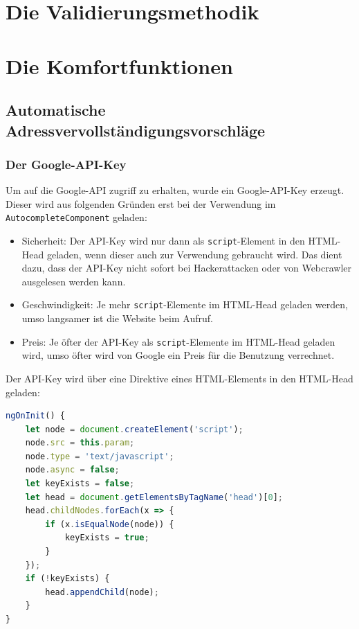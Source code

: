 \section{Die Validierungsmethodik}

\section{Die Komfortfunktionen}
\subsection{Automatische Adressvervollständigungsvorschläge}
\subsubsection{Der Google-API-Key}
Um auf die Google-API zugriff zu erhalten, wurde ein Google-API-Key erzeugt. Dieser wird aus folgenden Gründen erst bei der Verwendung im \texttt{AutocompleteComponent} geladen:

\begin{itemize}
	
	\item Sicherheit: Der API-Key wird nur dann als \texttt{script}-Element in den HTML-Head geladen, wenn dieser auch zur Verwendung gebraucht wird. Das dient dazu, dass der API-Key nicht sofort bei Hackerattacken oder von Webcrawler ausgelesen werden kann.
	
	\item Geschwindigkeit: Je mehr \texttt{script}-Elemente im HTML-Head geladen werden, umso langsamer ist die Website beim Aufruf.
	
	\item Preis: Je öfter der API-Key als \texttt{script}-Elemente im HTML-Head geladen wird, umso öfter wird von Google ein Preis für die Benutzung verrechnet.
\end{itemize}

Der API-Key wird über eine Direktive eines HTML-Elements in den HTML-Head geladen:

\begin{lstlisting}[caption={Die \texttt{ngOnInit()}-Methode der \texttt{LoadScriptDirective}}, language=JavaScript,label={lst:gpac}]
ngOnInit() {
	let node = document.createElement('script');
	node.src = this.param;
	node.type = 'text/javascript';
	node.async = false;
	let keyExists = false;
	let head = document.getElementsByTagName('head')[0];
	head.childNodes.forEach(x => {
		if (x.isEqualNode(node)) {
			keyExists = true;
		}
	});
	if (!keyExists) {
		head.appendChild(node);
	}
}
\end{lstlisting}

